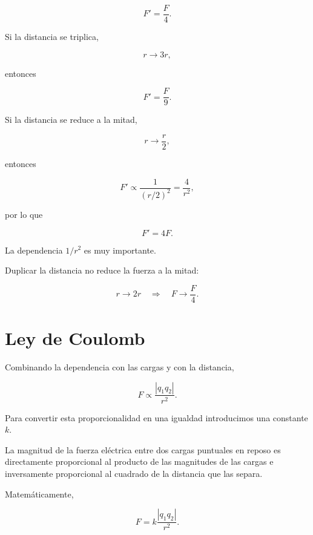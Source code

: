 \[
\boxed{
F'=\frac{F}{4}
}.
\]

Si la distancia se triplica,

\[
r\longrightarrow3r,
\]

entonces

\[
\boxed{
F'=\frac{F}{9}
}.
\]

Si la distancia se reduce a la mitad,

\[
r\longrightarrow\frac{r}{2},
\]

entonces

\[
F'
\propto
\frac{1}{(r/2)^2}
=
\frac{4}{r^2},
\]

por lo que

\[
\boxed{
F'=4F
}.
\]

\begin{idea}

La dependencia \(1/r^2\) es muy importante.

Duplicar la distancia no reduce la fuerza a la mitad:

\[
\boxed{
r\to2r
\quad\Longrightarrow\quad
F\to\frac{F}{4}
}.
\]

\end{idea}



\section{Ley de Coulomb}

Combinando la dependencia con las cargas y con la distancia,

\[
F\propto
\frac{|q_1q_2|}{r^2}.
\]

Para convertir esta proporcionalidad en una igualdad introducimos una
constante \(k\).

\begin{principio}

La magnitud de la fuerza eléctrica entre dos cargas puntuales en reposo es
directamente proporcional al producto de las magnitudes de las cargas e
inversamente proporcional al cuadrado de la distancia que las separa.

\end{principio}

Matemáticamente,

\begin{equation}
    \boxed{
    F
    =
    k
    \frac{|q_1q_2|}{r^2}
    }.
    \label{eq:ley_coulomb_magnitud}
\end{equation}

